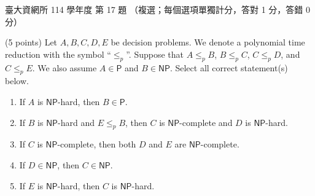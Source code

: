 \begin{pastexam}[label={px:ntu-114-dsa-17}]{臺大資網所 114 學年度 第 17 題}
（複選；每個選項單獨計分，答對 1 分，答錯 0 分）

(5 points) Let $A,B,C,D,E$ be decision problems. We denote a polynomial time reduction with the symbol
``$\le_p$''. Suppose that $A\le_p B$, $B\le_p C$, $C\le_p D$, and $C\le_p E$. We also assume $A\in\mathsf{P}$ and
$B\in\mathsf{NP}$. Select all correct statement(s) below.
\begin{enumerate}[label=(\Alph*)]
\item If $A$ is $\mathsf{NP}$-hard, then $B\in\mathsf{P}$.
\item If $B$ is $\mathsf{NP}$-hard and $E\le_p B$, then $C$ is $\mathsf{NP}$-complete and $D$ is $\mathsf{NP}$-hard.
\item If $C$ is $\mathsf{NP}$-complete, then both $D$ and $E$ are $\mathsf{NP}$-complete.
\item If $D\in\mathsf{NP}$, then $C\in\mathsf{NP}$.
\item If $E$ is $\mathsf{NP}$-hard, then $C$ is $\mathsf{NP}$-hard.
\end{enumerate}
\end{pastexam}

